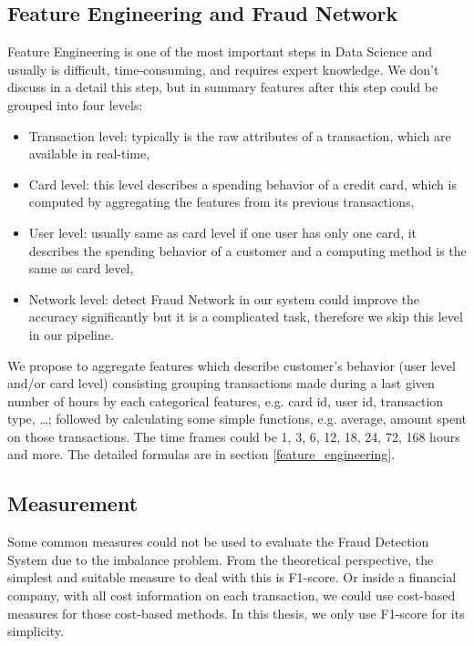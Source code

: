 \subsection*{Feature Engineering and Fraud Network}

Feature Engineering is one of the most important steps in Data Science and usually is difficult, time-consuming, and requires expert knowledge. We don't discuss in a detail this step, but in summary features after this step could be grouped into four levels:


\begin{itemize}
\item Transaction level: typically is the raw attributes of a transaction, which are available in real-time,
\item Card level: this level describes a spending behavior of a credit card, which is computed by aggregating the features from its previous transactions,
\item User level: usually same as card level if one user has only one card, it describes the spending behavior of a customer and a computing method is the same as card level,
\item Network level: detect Fraud Network in our system could improve the accuracy significantly but it is a complicated task, therefore we skip this level in our pipeline.
\end{itemize}


We propose to aggregate features which describe customer's behavior (user level and/or card level) consisting grouping transactions made during a last given number of hours by each categorical features, e.g. card id, user id, transaction type, \dots; followed by calculating some simple functions, e.g. average, amount spent on those transactions. The time frames could be 1, 3, 6, 12, 18, 24, 72, 168 hours and more. The detailed formulas are in section \ref{feature_engineering}.


\subsection*{Measurement}

Some common measures could not be used to evaluate the Fraud Detection System due to the imbalance problem. From the theoretical perspective, the simplest and suitable measure to deal with this is F1-score. Or inside a financial company, with all cost information on each transaction, we could use cost-based measures for those cost-based methods. In this thesis, we only use F1-score for its simplicity.


